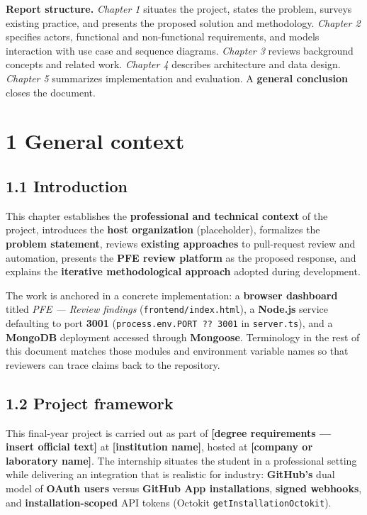 \documentclass[11pt,a4paper]{report}
\begin{document}
\textbf{Report structure.} \textit{Chapter 1} situates the project, states the problem, surveys existing practice, and presents the proposed solution and methodology. \textit{Chapter 2} specifies actors, functional and non-functional requirements, and models interaction with use case and sequence diagrams. \textit{Chapter 3} reviews background concepts and related work. \textit{Chapter 4} describes architecture and data design. \textit{Chapter 5} summarizes implementation and evaluation. A \textbf{general conclusion} closes the document.



\chapter{1 General context}


\section{1.1 Introduction}


This chapter establishes the \textbf{professional and technical context} of the project, introduces the \textbf{host organization} (placeholder), formalizes the \textbf{problem statement}, reviews \textbf{existing approaches} to pull-request review and automation, presents the \textbf{PFE review platform} as the proposed response, and explains the \textbf{iterative methodological approach} adopted during development.


The work is anchored in a concrete implementation: a \textbf{browser dashboard} titled \textit{PFE — Review findings} (\texttt{frontend/index.html}), a \textbf{Node.js} service defaulting to port \textbf{3001} (\texttt{process.env.PORT ?? 3001} in \texttt{server.ts}), and a \textbf{MongoDB} deployment accessed through \textbf{Mongoose}. Terminology in the rest of this document matches those modules and environment variable names so that reviewers can trace claims back to the repository.


\section{1.2 Project framework}


This final-year project is carried out as part of \textbf{[degree requirements — insert official text]} at \textbf{[institution name]}, hosted at \textbf{[company or laboratory name]}. The internship situates the student in a professional setting while delivering an integration that is realistic for industry: \textbf{GitHub’s} dual model of \textbf{OAuth users} versus \textbf{GitHub App installations}, \textbf{signed webhooks}, and \textbf{installation-scoped} API tokens (Octokit \texttt{getInstallationOctokit}).
\end{document}
